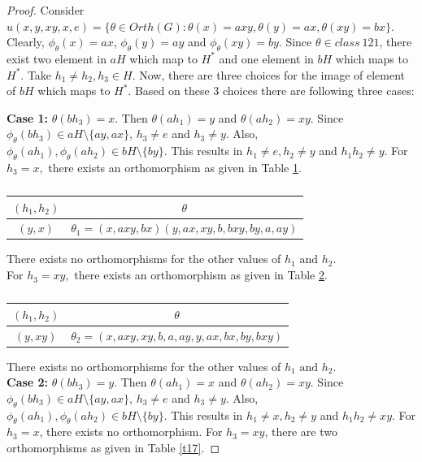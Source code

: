 \documentclass[11pt,a4paper]{article}
\theoremstyle{definition}
\theoremstyle{remark}
\begin{document}
\begin{proof}
 Consider $ u(x,y,xy,x,e) = \{\theta \in Orth(G) : \theta(x) = axy, \theta(y) = ax, \theta(xy) = bx\}.$  Clearly, $\phi_{\theta}(x) =ax$, $\phi_{\theta}(y) = ay$ and $\phi_{\theta}(xy) = by$. Since $\theta \in class~121$, there exist two element in $aH$ which map to $H^{\ast}$ and one element in $bH$ which maps to $H^{\ast}$.  Take $h_{1} \neq h_{2}, h_{3} \in H$.  Now, there are three choices for the image of element of $bH$ which maps to $H^{\ast}$. Based on these $3$ choices there are following three cases:  
 
 
\textbf{Case 1:}   $\theta(bh_{3}) = x.$ Then $\theta(ah_{1}) = y$ and $\theta(ah_{2}) = xy$. Since $\phi_{\theta}(bh_{3}) \in aH \setminus \{ay,ax\}$, $h_{3} \neq e$ and $h_{3} \neq y$. Also, $\phi_{\theta}(ah_{1}), \phi_{\theta}(ah_{2}) \in bH\setminus \{by\}.$ This results in $h_{1} \neq e, h_{2} \neq y$ and $h_{1}h_{2} \neq y$. For $h_{3} = x,$ there exists an orthomorphism as given in Table \ref{t15}.
\begin{table}[H]
\begin{center}
		\begin{tabular}{|c|c|}
		\hline
		$(h_{1},h_{2})$ & $\theta$\\ \hline
		$(y,x)$ &  $\theta_{1} = (x,axy,bx)(y,ax,xy,b,bxy,by,a,ay)$ \\ \hline
	\end{tabular}\caption{} \label{t15}
\end{center}
\end{table}
\vspace{-.7cm}
	There exists no orthomorphisms for the other values of $h_{1} \text{ and } h_{2}$.\\
For $h_{3} = xy,$ there exists an orthomorphism as given in Table \ref{t16}.
\begin{table}[H]
	\begin{center}
		\begin{tabular}{|c|c|}
		\hline
		$(h_{1},h_{2})$ & $\theta$\\ \hline
		$(y,xy)$ &  $\theta_{2} = (x,axy,xy,b,a,ay,y,ax,bx,by,bxy)$ \\ \hline
	\end{tabular} \caption{} \label{t16}
	\end{center}
\end{table}
\vspace{-.7cm}
	There exists no orthomorphisms for the other values of $h_{1} \text{ and } h_{2}$.\\
\textbf{Case 2:}   $\theta(bh_{3}) = y.$ Then $\theta(ah_{1}) = x$ and $\theta(ah_{2}) = xy$. Since $\phi_{\theta}(bh_{3}) \in aH \setminus \{ay,ax\}$, $h_{3} \neq e$ and $h_{3} \neq y$. Also, $\phi_{\theta}(ah_{1}), \phi_{\theta}(ah_{2}) \in bH\setminus \{by\}.$ This results in $h_{1} \neq x, h_{2} \neq y$ and $h_{1}h_{2} \neq xy$. For $h_{3} = x$, there exists no orthomorphism. For $h_{3} = xy$, there are two orthomorphisms as given in Table \ref{t17}.

\end{proof}
\end{document}
